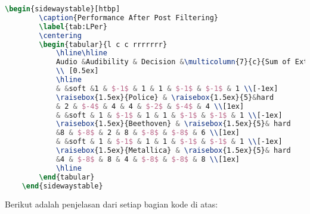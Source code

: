 \begin{lstlisting}[language=TeX, caption=Kode untuk Membuat Tabel dalam Dokumen dengan Sideway, label=lst:kode_tabel_sideway]
    \begin{sidewaystable}[htbp]
        \caption{Performance After Post Filtering}
        \label{tab:LPer}
        \centering
        \begin{tabular}{l c c rrrrrrr}
            \hline\hline
            Audio &Audibility & Decision &\multicolumn{7}{c}{Sum of Extracted Bits} 
            \\ [0.5ex] 
            \hline
            & &soft &1 & $-1$ & 1 & 1 & $-1$ & $-1$ & 1 \\[-1ex]
            \raisebox{1.5ex}{Police} & \raisebox{1.5ex}{5}&hard
            & 2 & $-4$ & 4 & 4 & $-2$ & $-4$ & 4 \\[1ex]
            & &soft & 1 & $-1$ & 1 & 1 & $-1$ & $-1$ & 1 \\[-1ex]
            \raisebox{1.5ex}{Beethoven} & \raisebox{1.5ex}{5}& hard
            &8 & $-8$ & 2 & 8 & $-8$ & $-8$ & 6 \\[1ex]
            & &soft & 1 & $-1$ & 1 & 1 & $-1$ & $-1$ & 1 \\[-1ex]
            \raisebox{1.5ex}{Metallica} & \raisebox{1.5ex}{5}& hard
            &4 & $-8$ & 8 & 4 & $-8$ & $-8$ & 8 \\[1ex]
            \hline
        \end{tabular}
    \end{sidewaystable}
\end{lstlisting}

\noindent Berikut adalah penjelasan dari setiap bagian kode di atas:

